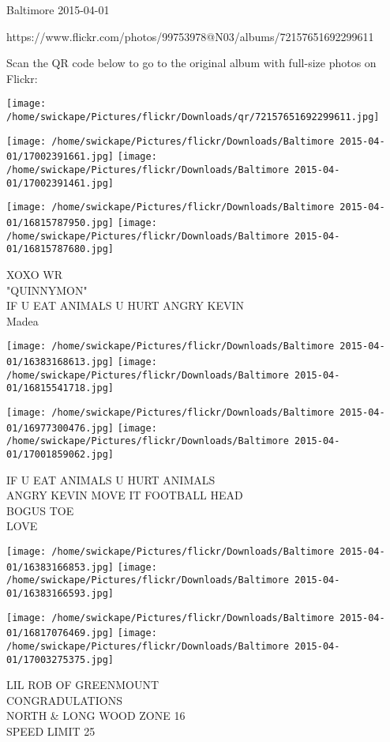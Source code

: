 \documentclass[10pt,letterpaper]{article}
\begin{document}
Baltimore 2015-04-01

https://www.flickr.com/photos/99753978@N03/albums/72157651692299611

Scan the QR code below to go to the original album with full-size photos on Flickr:

\texttt{[image: /home/swickape/Pictures/flickr/Downloads/qr/72157651692299611.jpg]}
\pagebreak

\texttt{[image: /home/swickape/Pictures/flickr/Downloads/Baltimore 2015-04-01/17002391661.jpg]}
\texttt{[image: /home/swickape/Pictures/flickr/Downloads/Baltimore 2015-04-01/17002391461.jpg]}

\texttt{[image: /home/swickape/Pictures/flickr/Downloads/Baltimore 2015-04-01/16815787950.jpg]}
\texttt{[image: /home/swickape/Pictures/flickr/Downloads/Baltimore 2015-04-01/16815787680.jpg]}

XOXO WR\\
"QUINNYMON"\\
IF U EAT ANIMALS U HURT ANGRY KEVIN\\
Madea
\pagebreak

\texttt{[image: /home/swickape/Pictures/flickr/Downloads/Baltimore 2015-04-01/16383168613.jpg]}
\texttt{[image: /home/swickape/Pictures/flickr/Downloads/Baltimore 2015-04-01/16815541718.jpg]}

\texttt{[image: /home/swickape/Pictures/flickr/Downloads/Baltimore 2015-04-01/16977300476.jpg]}
\texttt{[image: /home/swickape/Pictures/flickr/Downloads/Baltimore 2015-04-01/17001859062.jpg]}

IF U EAT ANIMALS U HURT ANIMALS\\
ANGRY KEVIN MOVE IT FOOTBALL HEAD\\
BOGUS TOE\\
LOVE
\pagebreak

\texttt{[image: /home/swickape/Pictures/flickr/Downloads/Baltimore 2015-04-01/16383166853.jpg]}
\texttt{[image: /home/swickape/Pictures/flickr/Downloads/Baltimore 2015-04-01/16383166593.jpg]}

\texttt{[image: /home/swickape/Pictures/flickr/Downloads/Baltimore 2015-04-01/16817076469.jpg]}
\texttt{[image: /home/swickape/Pictures/flickr/Downloads/Baltimore 2015-04-01/17003275375.jpg]}

LIL ROB OF GREENMOUNT\\
CONGRADULATIONS\\
NORTH \& LONG WOOD ZONE 16\\
SPEED LIMIT 25
\pagebreak
\end{document}
